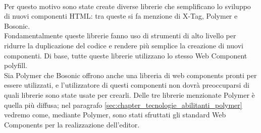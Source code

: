 \\
Per questo motivo sono state create diverse librerie che semplificano lo sviluppo di nuovi componenti HTML: tra queste si fa menzione di X-Tag, Polymer e Bosonic. 
\\
Fondamentalmente queste librerie fanno uso di strumenti di alto livello per ridurre la duplicazione del codice e rendere più semplice la creazione di nuovi componenti. Di base, tutte queste librerie utilizzano lo stesso Web Component polyfill. 
\\
Sia Polymer che Bosonic offrono anche una libreria di web components pronti per essere utilizzati, e l’utilizzatore di questi componenti non dovrà preoccuparsi di quali librerie sono state usate per crearli. 
Delle tre librerie menzionate Polymer è quella più diffusa; nel paragrafo \ref{sec:chapter_tecnologie_abilitanti_polymer} vedremo come, mediante Polymer, sono stati sfruttati gli standard Web Components per la realizzazione dell’editor.
\newpage
